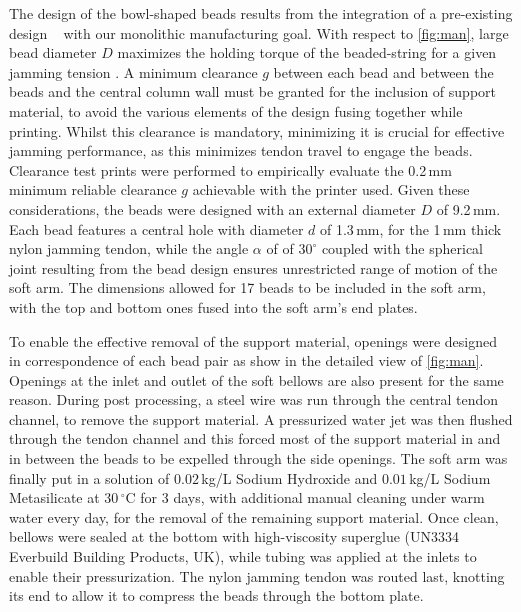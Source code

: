 The design of the bowl-shaped beads results from the integration of a pre-existing design ~\cite{bead_design} with our monolithic manufacturing goal. With respect to \cref{fig:man}, large bead diameter $D$ maximizes the holding torque of the beaded-string for a given jamming tension \cite{bead_design}. A minimum clearance $g$ between each bead and between the beads and the central column wall must be granted for the inclusion of support material, to avoid the various elements of the design fusing together while printing. Whilst this clearance is mandatory, minimizing it is crucial for effective jamming performance, as this minimizes tendon travel to engage the beads. Clearance test prints were performed to empirically evaluate the 0.2\,mm minimum reliable clearance $g$ achievable with the printer used. Given these considerations, the beads were designed with an external diameter $D$ of 9.2\,mm. Each bead features a central hole with diameter $d$ of 1.3\,mm, for the 1\,mm thick nylon jamming tendon, while the angle $\alpha$ of of $30^{\circ}$ coupled with the spherical joint resulting from the bead design ensures unrestricted range of motion of the soft arm. The dimensions allowed for 17 beads to be included in the soft arm, with the top and bottom ones fused into the soft arm's end plates.

To enable the effective removal of the support material, openings were designed in correspondence of each bead pair as show in the detailed view of \cref{fig:man}. Openings at the inlet and outlet of the soft bellows are also present for the same reason. During post processing, a steel wire was run through the central tendon channel, to remove the support material. A pressurized water jet was then flushed through the tendon channel and this forced most of the support material in and in between the beads to be expelled through the side openings. The soft arm was finally put in a solution of $0.02\,$kg/L Sodium Hydroxide and $0.01\,$kg/L Sodium Metasilicate at 30\,$^\circ\mathrm{C}$ for 3 days, with additional manual cleaning under warm water every day, for the removal of the remaining support material. Once clean, bellows were sealed at the bottom with high-viscosity superglue (UN3334 Everbuild Building Products, UK), while tubing was applied at the inlets to enable their pressurization. The nylon jamming tendon was routed last, knotting its end to allow it to compress the beads through the bottom plate.



